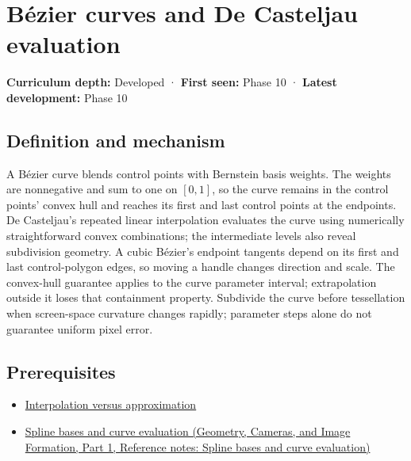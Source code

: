 \hypertarget{appendix-ddbec701898c}{}\label{referencestart:appendix-ddbec701898c}
\section{Bézier curves and De Casteljau evaluation}\label{appendix-ddbec701898c-buxe9zier-curves-and-de-casteljau-evaluation}

\hypertarget{appendix-ddbec701898c-bézier-curves-and-de-casteljau-evaluation}{}

\textbf{Curriculum depth:} Developed · \textbf{First seen:} Phase 10 · \textbf{Latest development:} Phase 10

\begin{allmightroledefinition}

\subsection{Definition and mechanism}\label{appendix-ddbec701898c-definition-and-mechanism}

\hypertarget{appendix-ddbec701898c-definition-and-mechanism}{}

A Bézier curve blends control points with Bernstein basis weights. The weights are nonnegative and sum to one on \([0,1]\), so the curve remains in the control points' convex hull and reaches its first and last control points at the endpoints. De Casteljau's repeated linear interpolation evaluates the curve using numerically straightforward convex combinations; the intermediate levels also reveal subdivision geometry. A cubic Bézier's endpoint tangents depend on its first and last control-polygon edges, so moving a handle changes direction and scale. The convex-hull guarantee applies to the curve parameter interval; extrapolation outside it loses that containment property. Subdivide the curve before tessellation when screen-space curvature changes rapidly; parameter steps alone do not guarantee uniform pixel error.

\end{allmightroledefinition}

\subsection{Prerequisites}\label{appendix-ddbec701898c-prerequisites}

\hypertarget{appendix-ddbec701898c-prerequisites}{}

\begin{itemize}
\tightlist
\item
  \hyperref[appendix-0c2a5f69851e]{Interpolation versus approximation}
\item
  \href{../03-Geometry-Cameras-and-Image-Formation-P01/main.pdf\#appendix-f28eeec97a3d}{Spline bases and curve evaluation (Geometry, Cameras, and Image Formation, Part 1, Reference notes: Spline bases and curve evaluation)}
\end{itemize}


